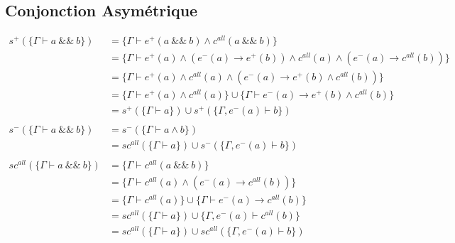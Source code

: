 \documentclass[12pt]{article}
\newcommand{\damp}{~\&\&~}
\begin{document}
\subsection*{Conjonction Asymétrique}
\begin{align*}
  s^+ (\{\Gamma \vdash a \damp b\})      & = \{\Gamma \vdash e^+(a \damp b) \land c^{all} (a \damp b)\}                                                         \\
                                         & = \{\Gamma \vdash e^+(a) \land (e^-(a) \rightarrow e^+(b)) \land c^{all} (a) \land (e^-(a) \rightarrow c^{all}(b))\} \\
                                         & = \{\Gamma \vdash e^+(a) \land c^{all} (a) \land (e^-(a) \rightarrow e^+(b) \land c^{all}(b))\}                      \\
                                         & = \{\Gamma \vdash e^+(a) \land c^{all} (a)\} \cup \{\Gamma \vdash e^-(a) \rightarrow e^+(b) \land c^{all}(b)\}       \\
                                         & = s^{+}(\{\Gamma \vdash a\}) \cup s^+ (\{\Gamma, e^-(a) \vdash b \})                                                 \\
  \\
  s^- (\{\Gamma \vdash a \damp b\})      & = s^- (\{\Gamma \vdash a \land b\})                                                                                  \\
                                         & = sc^{all} (\{\Gamma \vdash a\}) \cup s^- (\{\Gamma, e^- (a)\vdash b\})                                              \\
  \\
  sc^{all} (\{\Gamma \vdash a \damp b\}) & = \{\Gamma \vdash c^{all} (a \damp b)\}                                                                              \\
                                         & = \{\Gamma \vdash c^{all} (a) \land (e^- (a) \rightarrow c^{all}(b))\}                                               \\
                                         & = \{\Gamma \vdash c^{all} (a)\} \cup \{\Gamma \vdash e^- (a) \rightarrow c^{all}(b)\}                                \\
                                         & = sc^{all} (\{\Gamma \vdash a\}) \cup \{\Gamma, e^- (a) \vdash c^{all}(b)\}                                          \\
                                         & = sc^{all} (\{\Gamma \vdash a\}) \cup sc^{all} (\{\Gamma, e^- (a) \vdash b \})
\end{align*}
\end{document}
